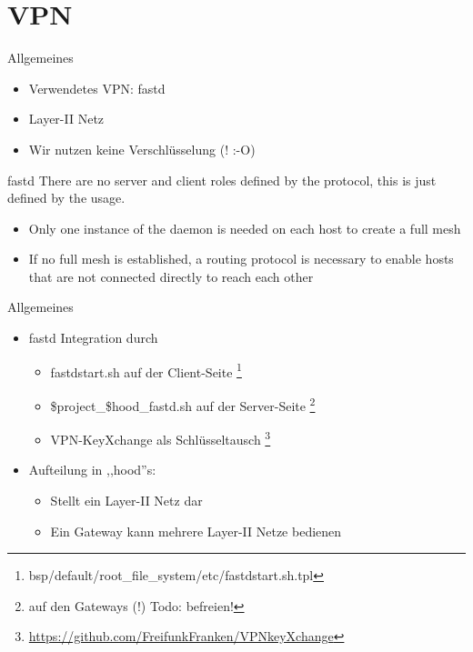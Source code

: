 \section{VPN}


\begin{frame}{Allgemeines}
    \begin{itemize}
        \item Verwendetes VPN: fastd
        \item Layer-II Netz
        \item Wir nutzen keine Verschlüsselung (! :-O)
    \end{itemize}
    \begin{block}{fastd}
        There are no server and client roles defined by the
        protocol, this is just defined by the usage.
        \begin{itemize}
            \item Only one instance of the daemon is needed on each
                host to create a full mesh
            \item If no full mesh is established, a routing protocol
                is necessary to enable hosts that are not connected
                directly to reach each other
        \end{itemize}
    \end{block}
\end{frame}

\begin{frame}{Allgemeines}
    \begin{itemize}
        \item fastd Integration durch
        \begin{itemize}
            \item fastdstart.sh auf der Client-Seite
                \footnote{bsp/default/root\_file\_system/etc/fastdstart.sh.tpl}
            \item \$project\_\$hood\_fastd.sh auf der Server-Seite
                \footnote{auf den Gateways (!) Todo: befreien!}
            \item VPN-KeyXchange als Schlüsseltausch
                \footnote{\url{https://github.com/FreifunkFranken/VPNkeyXchange}}
        \end{itemize}
        \item Aufteilung in ,,hood''s:
        \begin{itemize}
            \item Stellt ein Layer-II Netz dar
            \item Ein Gateway kann mehrere Layer-II Netze bedienen
        \end{itemize}
    \end{itemize}
\end{frame}

